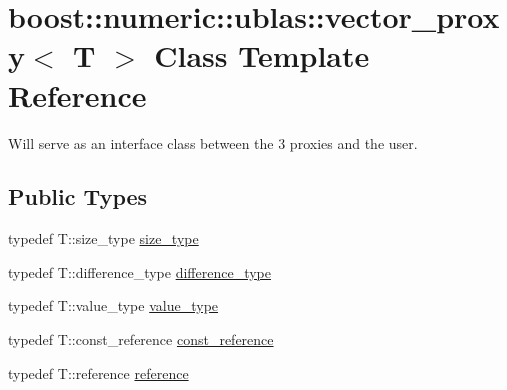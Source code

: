 \hypertarget{classboost_1_1numeric_1_1ublas_1_1vector__proxy}{}\section{boost\+:\+:numeric\+:\+:ublas\+:\+:vector\+\_\+proxy$<$ T $>$ Class Template Reference}
\label{classboost_1_1numeric_1_1ublas_1_1vector__proxy}


Will serve as an interface class between the 3 proxies and the user.  


\subsection*{Public Types}
\begin{DoxyCompactItemize}
\item 
typedef T\+::size\+\_\+type \hyperlink{classboost_1_1numeric_1_1ublas_1_1vector__proxy_a4ea16933b64c4075bcdee2298ab1b11a}{size\+\_\+type}
\item 
typedef T\+::difference\+\_\+type \hyperlink{classboost_1_1numeric_1_1ublas_1_1vector__proxy_ad030a4a516d8b6eb2d467af2a6fe8ec5}{difference\+\_\+type}
\item 
typedef T\+::value\+\_\+type \hyperlink{classboost_1_1numeric_1_1ublas_1_1vector__proxy_a61bef8c6490e69f94095186b0b1409e0}{value\+\_\+type}
\item 
typedef T\+::const\+\_\+reference \hyperlink{classboost_1_1numeric_1_1ublas_1_1vector__proxy_ae5b208fd787cd64034fae0d362198e76}{const\+\_\+reference}
\item 
typedef T\+::reference \hyperlink{classboost_1_1numeric_1_1ublas_1_1vector__proxy_a71ce5967fa951495f9a201a6b2f17e88}{reference}
\end{DoxyCompactItemize}
